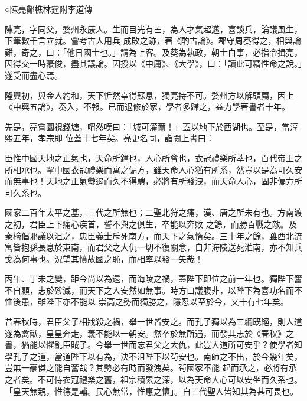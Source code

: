 
\begin{pinyinscope}

 ○陳亮鄭樵林霆附李道傳



 陳亮，字同父，婺州永康人。生而目光有芒，為人才氣超邁，喜談兵，論議風生，下筆數千言立就。嘗考古人用兵
 成敗之跡，著《酌古論》。郡守周葵得之，相與論難，奇之，曰：「他日國士也。」請為上客。及葵為執政，朝士白事，必指令揖亮，因得交一時豪俊，盡其議論。因授以《中庸》、《大學》，曰：「讀此可精性命之說。」遂受而盡心焉。



 隆興初，與金人約和，天下忻然幸得蘇息，獨亮持不可。婺州方以解頭薦，因上《中興五論》，奏入，不報。已而退修於家，學者多歸之，益力學著書者十年。



 先是，亮嘗圜視錢塘，喟然嘆曰：「城可灌爾！」蓋以地下於西湖也。至是，當淳熙五年，孝宗即
 位蓋十七年矣。亮更名同，詣闕上書曰：



 臣惟中國天地之正氣也，天命所鐘也，人心所會也，衣冠禮樂所萃也，百代帝王之所相承也。挈中國衣冠禮樂而寓之偏方，雖天命人心猶有所系，然豈以是為可久安而無事也！天地之正氣鬱遏而久不得騁，必將有所發洩，而天命人心，固非偏方所可久系也。



 國家二百年太平之基，三代之所無也；二聖北狩之痛，漢、唐之所未有也。方南渡之初，君臣上下痛心疾首，誓不與之俱生，卒能以奔敗
 之餘，而勝百戰之敵。及秦檜倡邪議以沮之，忠臣義士斥死南方，而天下之氣惰矣。三十年之餘，雖西北流寓皆抱孫長息於東南，而君父之大仇一切不復關念，自非海陵送死淮南，亦不知兵戈為何事也。況望其憤故國之恥，而相率以發一矢哉！



 丙午、丁未之變，距今尚以為遠，而海陵之禍，蓋陛下即位之前一年也。獨陛下奮不自顧，志於殄滅，而天下之人安然如無事。時方口議腹非，以陛下為喜功名而不恤後患，雖陛下亦不能以
 崇高之勢而獨勝之，隱忍以至於今，又十有七年矣。



 昔春秋時，君臣父子相戕殺之禍，舉一世皆安之。而孔子獨以為三綱既絕，則人道遂為禽獸，皇皇奔走，義不能以一朝安。然卒於無所遇，而發其志於《春秋》之書，猶能以懼亂臣賊子。今舉一世而忘君父之大仇，此豈人道所可安乎？使學者知學孔子之道，當道陛下以有為，決不沮陛下以茍安也。南師之不出，於今幾年矣，豈無一豪傑之能自奮哉？其勢必有時而發洩矣。茍國家不能
 起而承之，必將有承之者矣。不可恃衣冠禮樂之舊，祖宗積累之深，以為天命人心可以安坐而久系也。「皇天無親，惟德是輔。民心無常，惟惠之懷」。自三代聖人皆知其為甚可畏也。




\end{pinyinscope}
